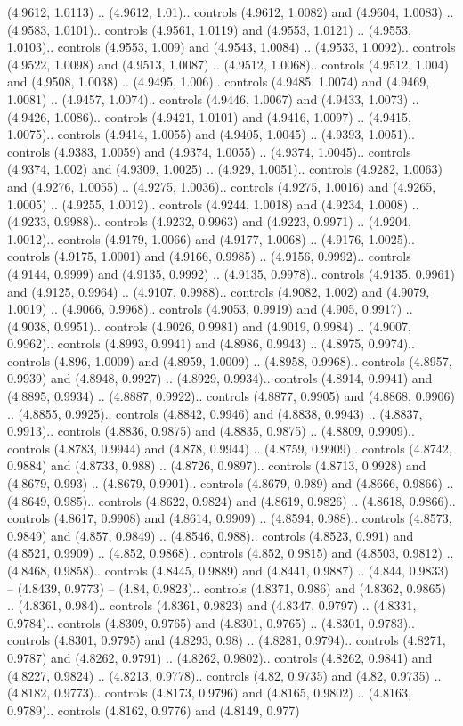 (4.9612, 1.0113) .. (4.9612, 1.01).. controls (4.9612, 1.0082) and (4.9604, 1.0083) .. (4.9583, 1.0101).. controls (4.9561, 1.0119) and (4.9553, 1.0121) .. (4.9553, 1.0103).. controls (4.9553, 1.009) and (4.9543, 1.0084) .. (4.9533, 1.0092).. controls (4.9522, 1.0098) and (4.9513, 1.0087) .. (4.9512, 1.0068).. controls (4.9512, 1.004) and (4.9508, 1.0038) .. (4.9495, 1.006).. controls (4.9485, 1.0074) and (4.9469, 1.0081) .. (4.9457, 1.0074).. controls (4.9446, 1.0067) and (4.9433, 1.0073) .. (4.9426, 1.0086).. controls (4.9421, 1.0101) and (4.9416, 1.0097) .. (4.9415, 1.0075).. controls (4.9414, 1.0055) and (4.9405, 1.0045) .. (4.9393, 1.0051).. controls (4.9383, 1.0059) and (4.9374, 1.0055) .. (4.9374, 1.0045).. controls (4.9374, 1.002) and (4.9309, 1.0025) .. (4.929, 1.0051).. controls (4.9282, 1.0063) and (4.9276, 1.0055) .. (4.9275, 1.0036).. controls (4.9275, 1.0016) and (4.9265, 1.0005) .. (4.9255, 1.0012).. controls (4.9244, 1.0018) and (4.9234, 1.0008) .. (4.9233, 0.9988).. controls (4.9232, 0.9963) and (4.9223, 0.9971) .. (4.9204, 1.0012).. controls (4.9179, 1.0066) and (4.9177, 1.0068) .. (4.9176, 1.0025).. controls (4.9175, 1.0001) and (4.9166, 0.9985) .. (4.9156, 0.9992).. controls (4.9144, 0.9999) and (4.9135, 0.9992) .. (4.9135, 0.9978).. controls (4.9135, 0.9961) and (4.9125, 0.9964) .. (4.9107, 0.9988).. controls (4.9082, 1.002) and (4.9079, 1.0019) .. (4.9066, 0.9968).. controls (4.9053, 0.9919) and (4.905, 0.9917) .. (4.9038, 0.9951).. controls (4.9026, 0.9981) and (4.9019, 0.9984) .. (4.9007, 0.9962).. controls (4.8993, 0.9941) and (4.8986, 0.9943) .. (4.8975, 0.9974).. controls (4.896, 1.0009) and (4.8959, 1.0009) .. (4.8958, 0.9968).. controls (4.8957, 0.9939) and (4.8948, 0.9927) .. (4.8929, 0.9934).. controls (4.8914, 0.9941) and (4.8895, 0.9934) .. (4.8887, 0.9922).. controls (4.8877, 0.9905) and (4.8868, 0.9906) .. (4.8855, 0.9925).. controls (4.8842, 0.9946) and (4.8838, 0.9943) .. (4.8837, 0.9913).. controls (4.8836, 0.9875) and (4.8835, 0.9875) .. (4.8809, 0.9909).. controls (4.8783, 0.9944) and (4.878, 0.9944) .. (4.8759, 0.9909).. controls (4.8742, 0.9884) and (4.8733, 0.988) .. (4.8726, 0.9897).. controls (4.8713, 0.9928) and (4.8679, 0.993) .. (4.8679, 0.9901).. controls (4.8679, 0.989) and (4.8666, 0.9866) .. (4.8649, 0.985).. controls (4.8622, 0.9824) and (4.8619, 0.9826) .. (4.8618, 0.9866).. controls (4.8617, 0.9908) and (4.8614, 0.9909) .. (4.8594, 0.988).. controls (4.8573, 0.9849) and (4.857, 0.9849) .. (4.8546, 0.988).. controls (4.8523, 0.991) and (4.8521, 0.9909) .. (4.852, 0.9868).. controls (4.852, 0.9815) and (4.8503, 0.9812) .. (4.8468, 0.9858).. controls (4.8445, 0.9889) and (4.8441, 0.9887) .. (4.844, 0.9833) -- (4.8439, 0.9773) -- (4.84, 0.9823).. controls (4.8371, 0.986) and (4.8362, 0.9865) .. (4.8361, 0.984).. controls (4.8361, 0.9823) and (4.8347, 0.9797) .. (4.8331, 0.9784).. controls (4.8309, 0.9765) and (4.8301, 0.9765) .. (4.8301, 0.9783).. controls (4.8301, 0.9795) and (4.8293, 0.98) .. (4.8281, 0.9794).. controls (4.8271, 0.9787) and (4.8262, 0.9791) .. (4.8262, 0.9802).. controls (4.8262, 0.9841) and (4.8227, 0.9824) .. (4.8213, 0.9778).. controls (4.82, 0.9735) and (4.82, 0.9735) .. (4.8182, 0.9773).. controls (4.8173, 0.9796) and (4.8165, 0.9802) .. (4.8163, 0.9789).. controls (4.8162, 0.9776) and (4.8149, 0.977) 